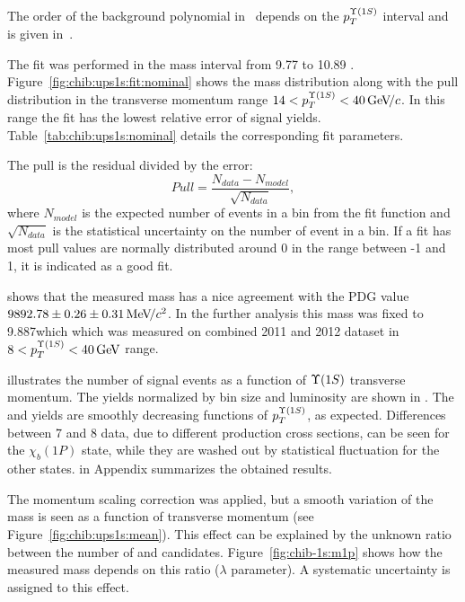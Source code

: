 The order of the background polynomial in~ depends on the
$p_{T}^{\OneS}$ interval and is given in~.



The fit was performed in the mass interval from  9.77 \gevcc to 10.89 \gevcc.
Figure~\ref{fig:chib:ups1s:fit:nominal} shows the mass distribution along with
the pull distribution in the transverse momentum range $14 < p_T^{\OneS} < 40
\gevc$. In this range the fit has the lowest relative error of signal yields. 
Table~\ref{tab:chib:ups1s:nominal} details the corresponding fit parameters.

The pull is the residual divided by the error:
\begin{equation}
\label{eq:pull}
Pull = \frac{N_{data} - N_{model}}{\sqrt{N_{data}}},
\end{equation}
\noindent where $N_{model}$ is the expected number of events in a bin from
the fit function and $\sqrt{N_{data}}$ is the statistical uncertainty on the
number of event in a bin. If a fit has most pull values  are normally distributed
around 0 in the range between -1 and 1, it is indicated as a good fit.





 shows that the measured \chiboneOneP mass
has a nice agreement with the PDG value $9892.78 \pm 0.26 \pm 0.31 {\mathrm{\,Me\kern -0.1em V\!/}c^2}$. In
the further analysis this mass was fixed to 9.887\gevcc which which was
measured on combined 2011 and 2012 dataset in $8<p_T^{\Y1S}<40 \gev$ range.


 illustrates the number of signal events as
a function of $\Y1S$ transverse momentum. The yields
normalized by bin size and luminosity are shown in
. The \chibOneP and \chibThreeP yields
are smoothly decreasing functions of $p_T^{\Y1S}$, as expected. Differences between 7 and 8\tev
data, due to different production cross sections, can be seen for the
$\chi_b(1P)$ state, while they are washed out by statistical fluctuation for
the other states.  in Appendix summarizes the
obtained results.



The momentum scaling correction was applied, but a smooth variation of the
\chiboneOneP mass is seen as a function of transverse momentum (see
Figure~\ref{fig:chib:ups1s:mean}). This effect can be explained by the unknown
ratio between the number of \chiboneOneP and \chiboneTwoP candidates.
Figure~\ref{fig:chib-1s:m1p} shows how the measured mass depends on this ratio
($\lambda$ parameter). A systematic uncertainty is assigned to this effect.

